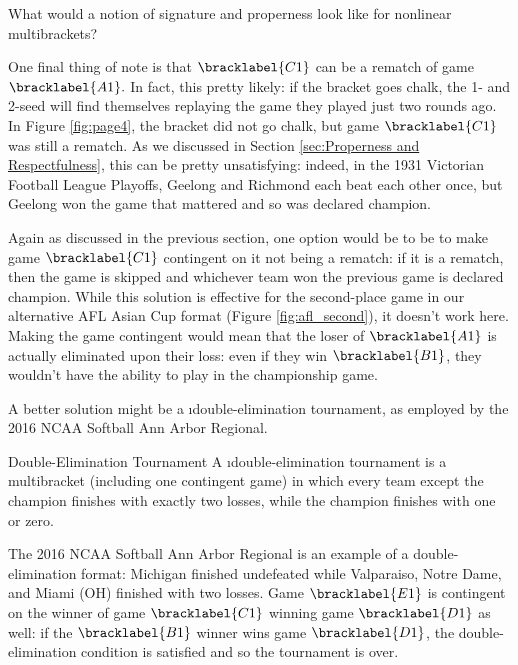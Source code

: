 {    \begin{oq}{}{}
        What would a notion of signature and properness look like for nonlinear multibrackets?
    \end{oq}


    One final thing of note is that $\bracklabel{C1}$ can be a rematch of game $\bracklabel{A1}.$ In fact, this pretty likely: if the bracket goes chalk, the 1- and 2-seed will find themselves replaying the game they played just two rounds ago. In Figure \ref{fig:page4}, the bracket did not go chalk, but game $\bracklabel{C1}$ was still a rematch. As we discussed in Section \ref{sec:Properness and Respectfulness}, this can be pretty unsatisfying: indeed, in the 1931 Victorian Football League Playoffs, Geelong and Richmond each beat each other once, but Geelong won the game that mattered and so was declared champion. 
    
    Again as discussed in the previous section, one option would be to be to make game $\bracklabel{C1}$ contingent on it not being a rematch: if it is a rematch, then the game is skipped and whichever team won the previous game is declared champion. While this solution is effective for the second-place game in our alternative AFL Asian Cup format (Figure \ref{fig:afl_second}), it doesn't work here. Making the game contingent would mean that the loser of $\bracklabel{A1}$ is actually eliminated upon their loss: even if they win $\bracklabel{B1}$, they wouldn't have the ability to play in the championship game.

    A better solution might be a \i{double-elimination tournament}, as employed by the 2016 NCAA Softball Ann Arbor Regional.


    \begin{definition}{Double-Elimination Tournament}{}
        A \i{double-elimination} tournament is a multibracket (including one contingent game) in which every team except the champion finishes with exactly two losses, while the champion finishes with one or zero. 
    \end{definition}


    The 2016 NCAA Softball Ann Arbor Regional is an example of a double-elimination format: Michigan finished undefeated while Valparaiso, Notre Dame, and Miami (OH) finished with two losses. Game $\bracklabel{E1}$ is contingent on the winner of game $\bracklabel{C1}$ winning game $\bracklabel{D1}$ as well: if the $\bracklabel{B1}$ winner wins game $\bracklabel{D1}$, the double-elimination condition is satisfied and so the tournament is over.

}
